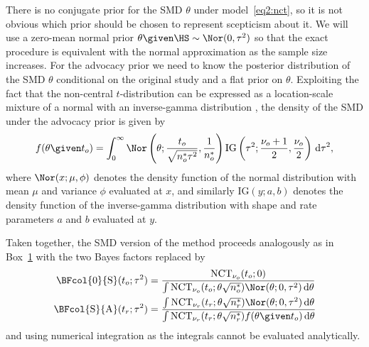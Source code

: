 There is no conjugate prior for the SMD $\theta$ under model~\eqref{eq2:nct}, so
it is not obvious which prior should be chosen to represent scepticism about it.
We will use a zero-mean normal prior $\theta \given \HS \sim \Nor(0, \tau^{2})$
so that the exact procedure is equivalent with the normal approximation as the
sample size increases. For the advocacy prior we need to know the posterior
distribution of the SMD $\theta$ conditional on the original study and a flat
prior on $\theta$. Exploiting the fact that the non-central $t$-distribution can
be expressed as a location-scale mixture of a normal with an inverse-gamma
distribution
\citep[chapter 31]{Johnson1995}, the density of the SMD under the advocacy prior
is given by
\begin{align*}
  f(\theta \given t_o)
  = \int_0^\infty \Nor\left(\theta; \frac{t_o}{\sqrt{n_o^* \tau^2}},
  \frac{1}{n_o^*}\right)  \text{IG}\left(\tau^2; \frac{\nu_o + 1}{2},
  \frac{\nu_o}{2}\right) \, \text{d}\tau^2,
\end{align*}
where $\Nor(x; \mu, \phi)$ denotes the density function of the normal
distribution with mean $\mu$ and variance $\phi$ evaluated at $x$, and similarly
$\text{IG}(y; a, b)$ denotes the density function of the inverse-gamma
distribution with shape and rate parameters $a$ and $b$ evaluated at $y$.

Taken together, the SMD version of the method proceeds analogously as in
Box~\hyperref[box:nutshell]{1} with the two Bayes factors replaced by
\begin{align*}
  \BFcol{0}{\mathrm{S}}(t_{o};\tau^{2})
  &= \frac{\text{NCT}_{\nu_{o}}(t_{o}; 0)}{\int
  \text{NCT}_{\nu_{o}}(t_{o}; \theta \sqrt{n_{o}^{*}})
  \Nor(\theta; 0, \tau^{2}) \, \text{d}\theta} \\
  \BFcol{\text{S}}{\text{A}}(t_{r};\tau^{2})
  &= \frac{\int\text{NCT}_{\nu_{r}}(t_{r};\theta
  \sqrt{n_{r}^{*}})\Nor(\theta; 0, \tau^{2}) \, \text{d}\theta}{
  \int\text{NCT}_{\nu_{r}}(t_{r};\theta
  \sqrt{n_{r}^{*}}) f(\theta \given t_{o}) \, \text{d} \theta}
\end{align*}
and using numerical integration as the integrals cannot be evaluated
analytically.



